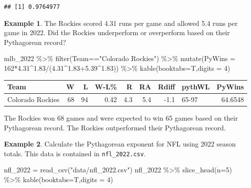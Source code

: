 \documentclass[
  11pt,
]{book}
\newenvironment{Shaded}{\begin{snugshade}}{\end{snugshade}}
\newcommand{\AttributeTok}[1]{\textcolor[rgb]{0.77,0.63,0.00}{#1}}
\newcommand{\DecValTok}[1]{\textcolor[rgb]{0.00,0.00,0.81}{#1}}
\newcommand{\FloatTok}[1]{\textcolor[rgb]{0.00,0.00,0.81}{#1}}
\newcommand{\FunctionTok}[1]{\textcolor[rgb]{0.00,0.00,0.00}{#1}}
\newcommand{\NormalTok}[1]{#1}
\newcommand{\OtherTok}[1]{\textcolor[rgb]{0.56,0.35,0.01}{#1}}
\newcommand{\SpecialCharTok}[1]{\textcolor[rgb]{0.00,0.00,0.00}{#1}}
\newcommand{\StringTok}[1]{\textcolor[rgb]{0.31,0.60,0.02}{#1}}
\theoremstyle{definition}
\theoremstyle{definition}
\newtheorem{example}{Example}[chapter]
\theoremstyle{definition}
\theoremstyle{definition}
\theoremstyle{remark}
\begin{document}
\begin{verbatim}
## [1] 0.9764977
\end{verbatim}

\begin{example}
The Rockies scored 4.31 runs per game and allowed 5.4 runs per game in 2022. Did the Rockies underperform or overperform based on their Pythagorean record?
\end{example}

\begin{Shaded}
\begin{Highlighting}[]
\NormalTok{mlb\_2022 }\SpecialCharTok{\%\textgreater{}\%} \FunctionTok{filter}\NormalTok{(Team}\SpecialCharTok{==}\StringTok{"Colorado Rockies"}\NormalTok{) }\SpecialCharTok{\%\textgreater{}\%}
  \FunctionTok{mutate}\NormalTok{(}\AttributeTok{PyWins =} \DecValTok{162}\SpecialCharTok{*}\FloatTok{4.31}\SpecialCharTok{\^{}}\FloatTok{1.83}\SpecialCharTok{/}\NormalTok{(}\FloatTok{4.31}\SpecialCharTok{\^{}}\FloatTok{1.83+5.39}\SpecialCharTok{\^{}}\FloatTok{1.83}\NormalTok{)) }\SpecialCharTok{\%\textgreater{}\%} 
  \FunctionTok{kable}\NormalTok{(}\AttributeTok{booktabs=}\NormalTok{T,}\AttributeTok{digits =} \DecValTok{4}\NormalTok{)}
\end{Highlighting}
\end{Shaded}

\begin{tabular}{lrrrrrrlr}
\toprule
Team & W & L & W-L\% & R & RA & Rdiff & pythWL & PyWins\\
\midrule
Colorado Rockies & 68 & 94 & 0.42 & 4.3 & 5.4 & -1.1 & 65-97 & 64.6548\\
\bottomrule
\end{tabular}

The Rockies won 68 games and were expected to win 65 games based on their Pythagorean record. The Rockies outperformed their Pythagorean record.

\newpage

\begin{example}
Calculate the Pythagorean exponent for NFL using 2022 season totals. This data is contained in \texttt{nfl\_2022.csv}.
\end{example}

\begin{Shaded}
\begin{Highlighting}[]
\NormalTok{nfl\_2022 }\OtherTok{=} \FunctionTok{read\_csv}\NormalTok{(}\StringTok{"data/nfl\_2022.csv"}\NormalTok{)}
\NormalTok{nfl\_2022 }\SpecialCharTok{\%\textgreater{}\%} 
  \FunctionTok{slice\_head}\NormalTok{(}\AttributeTok{n=}\DecValTok{5}\NormalTok{) }\SpecialCharTok{\%\textgreater{}\%} 
  \FunctionTok{kable}\NormalTok{(}\AttributeTok{booktabs=}\NormalTok{T,}\AttributeTok{digits =} \DecValTok{4}\NormalTok{)}
\end{Highlighting}
\end{Shaded}
\end{document}
